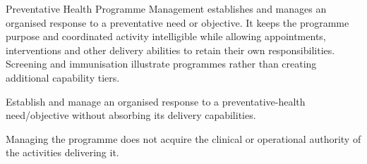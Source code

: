 Preventative Health Programme Management establishes and manages an organised response to a preventative need or objective. It keeps the programme purpose and coordinated activity intelligible while allowing appointments, interventions and other delivery abilities to retain their own responsibilities. Screening and immunisation illustrate programmes rather than creating additional capability tiers.



Establish and manage an organised response to a preventative-health need/\allowbreak{}objective without absorbing its delivery capabilities.



Managing the programme does not acquire the clinical or operational authority of the activities delivering it.



